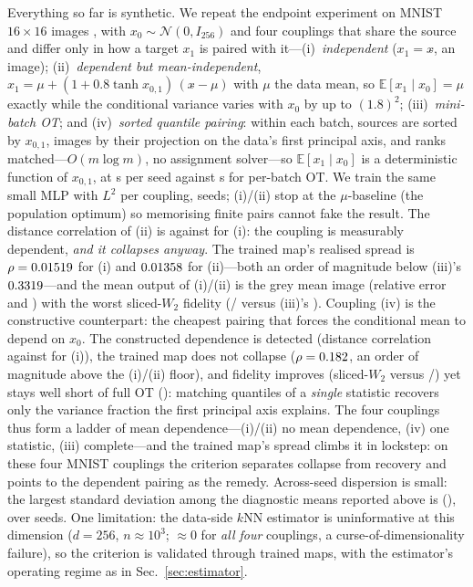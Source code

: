 \documentclass{article}
\theoremstyle{plain}
\newcommand{\Eop}{\mathbb{E}}
\newcommand{\Ncal}{\mathcal{N}}
\begin{document}
Everything so far is synthetic. We repeat the endpoint experiment on MNIST
$16{\times}16$ images \citep{lecun1998mnist}, with $x_0\sim\Ncal(0,I_{256})$ and four
couplings that share the source and differ only in how a target $x_1$ is paired with
it---(i)~\emph{independent} ($x_1=x\tilde{}$, an image); (ii)~\emph{dependent but
mean-independent}, $x_1=\mu+(1+0.8\tanh x_{0,1})\,(x\tilde{}-\mu)$ with $\mu$ the data
mean, so $\Eop[x_1\mid x_0]=\mu$ exactly while the conditional variance varies with $x_0$
by up to $(1.8)^2$; (iii)~\emph{mini-batch OT}; and (iv)~\emph{sorted quantile pairing}:
within each batch, sources are sorted by $x_{0,1}$, images by their projection on the
data's first principal axis, and ranks matched---$O(m\log m)$, no assignment solver---so
$\Eop[x_1\mid x_0]$ is a deterministic function of $x_{0,1}$, at \MnistDSeconds{} s per
seed against \MnistCSeconds{} s for per-batch OT. We train the same small MLP with $L^2$
per coupling, \MnistNSeeds{} seeds; (i)/(ii) stop at the $\mu$-baseline (the population
optimum) so memorising finite pairs cannot fake the result.
The distance correlation \citep{szekely2007distancecorr} of (ii) is \MnistBDcor{} against \MnistADcor{} for (i):
the coupling is measurably dependent, \emph{and it collapses anyway}. The trained
map's realised spread is $\rho=0.01519{}$ for (i) and $0.01358{}$ for
(ii)---both an order of magnitude below (iii)'s $0.3319{}$---and the mean
output of (i)/(ii) is the grey mean image (relative error \MnistAMuErr{} and
\MnistBMuErr{}) with the worst sliced-$W_2$ fidelity (\MnistACsw{}/\MnistBCsw{}
versus (iii)'s \MnistCCsw{}).
Coupling (iv) is the constructive counterpart: the cheapest pairing that forces
the conditional mean to depend on $x_0$. The constructed dependence is detected
(distance correlation \MnistDDcor{} against \MnistADcor{} for (i)), the trained map
does not collapse ($\rho=0.182{}$, an order of magnitude above the (i)/(ii)
floor), and fidelity improves (sliced-$W_2$ \MnistDCsw{} versus
\MnistACsw{}/\MnistBCsw{}) yet stays well short of full OT (\MnistCCsw{}): matching
quantiles of a \emph{single} statistic recovers only the variance fraction the first
principal axis explains. The four couplings thus form a ladder of mean
dependence---(i)/(ii) no mean dependence, (iv) one statistic, (iii) complete---and the
trained
map's spread climbs it in lockstep: on these four MNIST couplings the criterion
separates collapse from recovery and points to the dependent pairing as the remedy.
Across-seed dispersion is small: the largest standard deviation among the diagnostic
means reported above is \MnistMaxStd{} (\MnistMaxStdOf{}), over \MnistNSeeds{} seeds.
One limitation: the data-side $k$NN estimator is uninformative at this dimension
($d{=}256$, $n{\approx}10^3$; $\approx 0$ for \emph{all four} couplings, a
curse-of-dimensionality failure), so the criterion is validated through trained maps,
with the estimator's operating regime as in Sec.~\ref{sec:estimator}.
\end{document}
